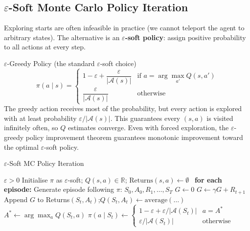 \documentclass[11pt,a4paper]{article}
\newcommand{\R}{\mathbb{R}}
\newcommand{\term}[1]{\textcolor{DefGreen}{\textbf{#1}}}
\begin{document}
\subsection{$\varepsilon$-Soft Monte Carlo Policy Iteration}

Exploring starts are often infeasible in practice (we cannot teleport the agent to arbitrary states). The alternative is an \term{$\varepsilon$-soft policy}: assign positive probability to all actions at every step.

\begin{defbox}{$\varepsilon$-Greedy Policy (the standard $\varepsilon$-soft choice)}
\[
\pi(a\mid s) = \begin{cases}
1-\varepsilon + \dfrac{\varepsilon}{|\mathcal{A}(s)|} & \text{if } a = \arg\max_{a'} Q(s,a')\\[8pt]
\dfrac{\varepsilon}{|\mathcal{A}(s)|} & \text{otherwise}
\end{cases}
\]
The greedy action receives most of the probability, but every action is explored with at least probability $\varepsilon/|\mathcal{A}(s)|$. This guarantees every $(s,a)$ is visited infinitely often, so $Q$ estimates converge. Even with forced exploration, the $\varepsilon$-greedy policy improvement theorem guarantees monotonic improvement toward the optimal $\varepsilon$-soft policy.
\end{defbox}

\begin{algobox}[breakable]{$\varepsilon$-Soft MC Policy Iteration}
\begin{algorithmic}[1]
\Require $\varepsilon > 0$
\State Initialise $\pi$ as $\varepsilon$-soft; $Q(s,a)\in\R$; $\text{Returns}(s,a)\leftarrow\emptyset$
\Loop\ \textbf{for each episode:}
  \State Generate episode following $\pi$: $S_0,A_0,R_1,\ldots,S_T$
  \State $G\leftarrow 0$
    \State $G\leftarrow\gamma G+R_{t+1}$
      \State Append $G$ to Returns$(S_t,A_t)$;\quad $Q(S_t,A_t)\leftarrow\text{average}(\ldots)$
    \EndIf
    \State $A^*\leftarrow\arg\max_a Q(S_t,a)$
      \State $\pi(a\mid S_t)\leftarrow\begin{cases}1-\varepsilon+\varepsilon/|\mathcal{A}(S_t)| & a=A^* \\ \varepsilon/|\mathcal{A}(S_t)| & \text{otherwise}\end{cases}$
    \EndFor
  \EndFor
\EndLoop
\end{algorithmic}
\end{algobox}
\end{document}
